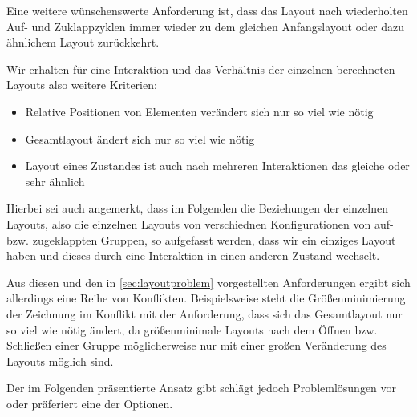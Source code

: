 Eine weitere wünschenswerte Anforderung ist, dass das Layout nach wiederholten Auf- und Zuklappzyklen immer wieder zu dem gleichen Anfangslayout oder dazu ähnlichem Layout zurückkehrt.

Wir erhalten für eine Interaktion und das Verhältnis der einzelnen berechneten Layouts also weitere Kriterien:
\begin{itemize}
\item Relative Positionen von Elementen verändert sich nur so viel wie nötig
\item Gesamtlayout ändert sich nur so viel wie nötig
\item Layout eines Zustandes ist auch nach mehreren Interaktionen das gleiche oder sehr ähnlich
\end{itemize}

Hierbei sei auch angemerkt, dass im Folgenden die Beziehungen der einzelnen Layouts, also die einzelnen Layouts von verschiednen Konfigurationen von auf- bzw. zugeklappten Gruppen, so aufgefasst werden, dass wir ein einziges Layout haben und dieses durch eine Interaktion in einen anderen Zustand wechselt.


Aus diesen und den in \autoref{sec:layoutproblem} vorgestellten Anforderungen ergibt sich allerdings eine Reihe von Konflikten.
Beispielsweise steht die Größenminimierung der Zeichnung im Konflikt mit der Anforderung, dass sich das Gesamtlayout nur so viel wie nötig ändert, 
da größenminimale Layouts nach dem Öffnen bzw. Schließen einer Gruppe möglicherweise nur mit einer großen Veränderung des Layouts möglich sind.

Der im Folgenden präsentierte Ansatz gibt schlägt jedoch Problemlösungen vor oder präferiert eine der Optionen.






